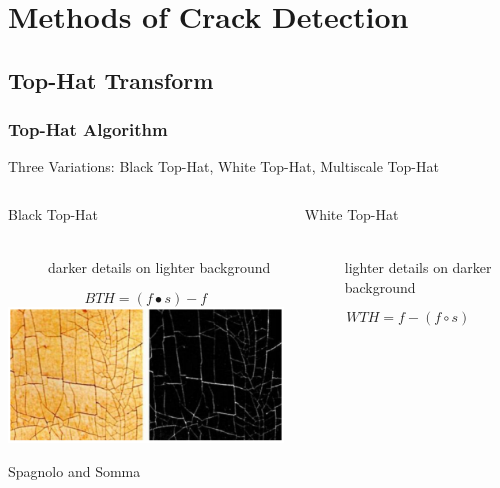 \documentclass{beamer}
\begin{document}
\section[Methods of Crack Detection]{Methods of Crack Detection}

\subsection[Top-Hat Transform]{Top-Hat Transform}

\begin{frame}
\frametitle{Top-Hat Algorithm}
Three Variations: Black Top-Hat, White Top-Hat, Multiscale Top-Hat
\linebreak
\begin{columns}
\begin{column}{0.5\textwidth}
\begin{description}
\item[Black Top-Hat] \hfill \\ darker details on lighter background
\end{description}
\begin{equation*}
BTH = (f \bullet s) - f
\end{equation*}
\includegraphics[width=1\textwidth]{black_top_hat}
\begin{center}
\tiny Spagnolo and Somma
\end{center}
\end{column}
\begin{column}{0.5\textwidth}
\begin{description}
\item[White Top-Hat] \hfill \\ lighter details on darker background
\end{description}
\begin{equation*}
WTH = f - (f \circ s)
\end{equation*}

\end{column}
\end{columns}
\end{frame}
\end{document}
